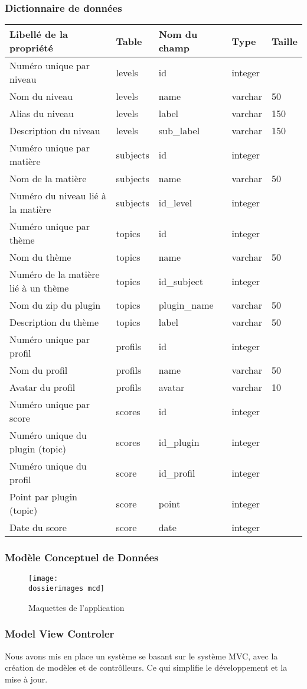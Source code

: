 \subsubsection{Dictionnaire de données}
\begin{tabbing}
\begin{tabular}{l l l l l}
	\hline
	Libellé de la propriété & Table & Nom du champ & Type & Taille \\
	\hline
	Numéro unique par niveau & levels & id & integer & \\	
	Nom du niveau & levels & name & varchar & 50 \\
	Alias du niveau & levels & label & varchar & 150 \\
	Description du niveau & levels & sub\_label & varchar & 150 \\
	Numéro unique par matière & subjects & id & integer & \\
	Nom de la matière & subjects & name & varchar & 50 \\
	Numéro du niveau lié à la matière & subjects & id\_level & integer	 & \\
	Numéro unique par thème & topics & id & integer & \\
	Nom du thème & topics & name & varchar & 50 \\
	Numéro de la matière lié à un thème & topics & id\_subject & 	integer & \\
	Nom du zip du plugin & topics & plugin\_name & varchar & 50 \\
	Description du thème & topics & label & varchar & 50 \\
	Numéro unique par profil & profils & id & integer & \\
	Nom du profil & profils & name & varchar & 50 \\
	Avatar du profil & profils & avatar & varchar & 10 \\
	Numéro unique par score & scores & id & integer & \\
	Numéro unique du plugin (topic) & scores & id\_plugin & integer & \\
	Numéro unique du profil & score & id\_profil & integer & \\
	Point par plugin (topic) & score & point & integer & \\
	Date du score & score & date & integer & \\
\end{tabular}
\end{tabbing}

\subsubsection{Modèle Conceptuel de Données}
\begin{figure}[H]
	\begin{center}
		\texttt{[image: \\dossierimages mcd]}
	\end{center}
	\caption{Maquettes de l'application}
	\label{Maquettes de l'application}
\end{figure}

\subsubsection{Model View Controler}
Nous avons mis en place un système se basant sur le système MVC, avec la création de modèles et de contr\^{o}lleurs. Ce qui simplifie le développement et la mise à jour.